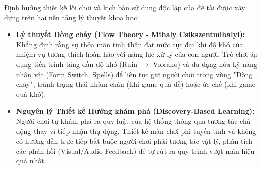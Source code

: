 \documentclass[../DoAn.tex]{subfiles}
\begin{document}
Định hướng thiết kế lối chơi và kịch bản sử dụng độc lập của đề tài được xây dựng trên hai nền tảng lý thuyết khoa học:
\begin{itemize}
    \item \textbf{Lý thuyết Dòng chảy (Flow Theory - Mihaly Csikszentmihalyi):} Khẳng định rằng sự thỏa mãn tinh thần đạt mức cực đại khi độ khó của nhiệm vụ tương thích hoàn hảo với năng lực xử lý của con người. Trò chơi áp dụng tiến trình tăng dần độ khó (Ruin $\rightarrow$ Volcano) và đa dạng hóa kỹ năng nhân vật (Form Switch, Spells) để liên tục giữ người chơi trong vùng "Dòng chảy", tránh trạng thái nhàm chán (khi game quá dễ) hoặc ức chế (khi game quá khó).
    \item \textbf{Nguyên lý Thiết kế Hướng khám phá (Discovery-Based Learning):} Người chơi tự khám phá ra quy luật của hệ thống thông qua tương tác chủ động thay vì tiếp nhận thụ động. Thiết kế màn chơi phi tuyến tính và không có hướng dẫn trực tiếp bắt buộc người chơi phải tương tác vật lý, phân tích các phản hồi (Visual/Audio Feedback) để tự rút ra quy trình vượt màn hiệu quả nhất.
\end{itemize}
\end{document}
